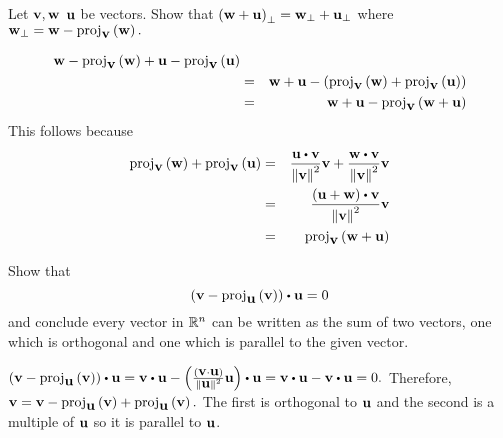 \begin{enumialphparenastyle}
\begin{ex} \label{perplinear} Let $\mbox{\bf v},\mbox{\bf w}$ $\mbox{\bf u}$ be vectors. Show
that $\left(\mbox{\bf w}+\mbox{\bf u}\right) _{\perp }=\mbox{\bf w}_{\perp }+\mbox{\bf u}_{\perp }$
 where $\mbox{\bf w}_{\perp }=\mbox{\bf w}-\mbox{\rm proj}_{\mbox{\bf v}}\left(\mbox{\bf w}\right) .$
\begin{sol}
\begin{eqnarray*}
\mbox{\bf w}-\mbox{\rm proj}_{\mbox{\bf v}}\left(\mbox{\bf w}\right) +\mbox{\bf u}- \mbox{\rm proj}_{\mbox{\bf v}}\left(\mbox{\bf u}\right) \\
&=&\mbox{\bf w}+\mbox{\bf u}-\left(\mbox{\rm proj}_{\mbox{\bf v}}\left(\mbox{\bf w}\right) +\mbox{\rm proj}_{\mbox{\bf v}}\left(\mbox{\bf u}\right) \right) \\
&=&\mbox{\bf w}+\mbox{\bf u}-\mbox{\rm proj}_{\mbox{\bf v}}\left(\mbox{\bf w}+\mbox{\bf u}\right) 
\end{eqnarray*}
This follows because 
\begin{eqnarray*}
\func{proj}_{\vect{v}}\tup{\vect{w}} +\func{proj}_{\vect{v}}\tup{
\vect{u}} &=& \frac{\vect{u}\dotprod \vect{v}}{\norm{\vect{v}} ^{2}}\vect{v}+
\frac{\vect{w}\dotprod \vect{v}}{\norm{\vect{v}} ^{2}}\vect{v} \\
&=& \frac{\tup{\vect{u}+\vect{w}} \dotprod \vect{v}}{\norm{\vect{v}
} ^{2}}\vect{v} \\
&=& \func{proj}_{\vect{v}}\tup{\vect{w}+\vect{u}}
\end{eqnarray*}
\end{sol}
\end{ex}

\begin{ex} Show that
\begin{equation*}
 \tup{\vect{v}-\func{proj}_{\vect{u}
}\tup{\vect{v}} } \dotprod \vect{u}=0
\end{equation*}
and conclude every vector in $\mathbb{R}^{n}$ can be written as the sum of
two vectors, one which is orthogonal and one which is parallel to the
given vector.
\begin{sol}
$\tup{\vect{v}-\func{proj}_{\vect{u}}\tup{\vect{v}} } \dotprod \vect{u} =  \vect{v} \dotprod \vect{u} -\tup{\frac{\tup{\vect{v}\cdot\vect{u}} }{\norm{\vect{u}} ^{2}}\vect{u} } \dotprod \vect{u} = \vect{v} \dotprod \vect{u} - \vect{v} \dotprod \vect{u} =0.$ Therefore, $\mbox{\bf v} = \mbox{\bf v} - \mbox{\rm proj}_{\mbox{\bf u}}\left(\mbox{\bf v}\right) + \mbox{\rm proj}_{\mbox{\bf u}}\left(\mbox{\bf v}\right).$ The first is orthogonal to $\mbox{\bf u}$ and the second is a multiple
of $\mbox{\bf u}$ so it is parallel to $\mbox{\bf u}$.
\end{sol}
\end{ex}

\end{enumialphparenastyle}

